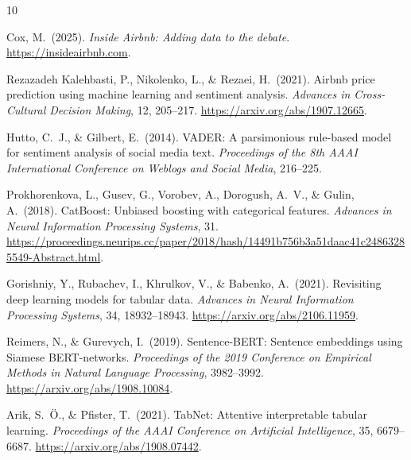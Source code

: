 \documentclass[10pt,a4paper]{article}
\begin{document}
\begin{thebibliography}{10}

Cox, M.\ (2025). \textit{Inside Airbnb: Adding data to the debate}.
\url{https://insideairbnb.com}.

Rezazadeh Kalehbasti, P., Nikolenko, L., \& Rezaei, H.\ (2021).
Airbnb price prediction using machine learning and sentiment analysis.
\textit{Advances in Cross-Cultural Decision Making}, 12, 205--217.
\url{https://arxiv.org/abs/1907.12665}.

Hutto, C.\ J., \& Gilbert, E.\ (2014).
VADER: A parsimonious rule-based model for sentiment analysis of social media text.
\textit{Proceedings of the 8th AAAI International Conference on Weblogs and
Social Media}, 216--225.

Prokhorenkova, L., Gusev, G., Vorobev, A., Dorogush, A.\ V., \& Gulin, A.\
(2018). CatBoost: Unbiased boosting with categorical features.
\textit{Advances in Neural Information Processing Systems}, 31.
\url{https://proceedings.neurips.cc/paper/2018/hash/14491b756b3a51daac41c24863285549-Abstract.html}.

Gorishniy, Y., Rubachev, I., Khrulkov, V., \& Babenko, A.\ (2021).
Revisiting deep learning models for tabular data.
\textit{Advances in Neural Information Processing Systems}, 34, 18932--18943.
\url{https://arxiv.org/abs/2106.11959}.

Reimers, N., \& Gurevych, I.\ (2019).
Sentence-BERT: Sentence embeddings using Siamese BERT-networks.
\textit{Proceedings of the 2019 Conference on Empirical Methods in Natural
Language Processing}, 3982--3992.
\url{https://arxiv.org/abs/1908.10084}.

Arik, S.\ \"{O}., \& Pfister, T.\ (2021).
TabNet: Attentive interpretable tabular learning.
\textit{Proceedings of the AAAI Conference on Artificial Intelligence},
35, 6679--6687.
\url{https://arxiv.org/abs/1908.07442}.

\end{thebibliography}
\end{document}

